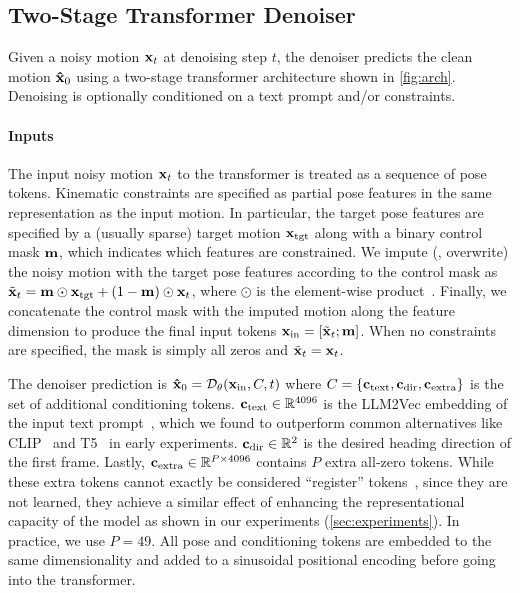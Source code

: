 \subsection{Two-Stage Transformer Denoiser}
\label{sec:method:diffusion_arch}

Given a noisy motion $\mathbf{x}_t$ at denoising step $t$, the denoiser predicts the clean motion $\mathbf{\hat{x}}_{0}$ using a two-stage transformer architecture shown in \cref{fig:arch}. Denoising is optionally conditioned on a text prompt and/or constraints.

\paragraph{Inputs}
The input noisy motion $\mathbf{x}_t$ to the transformer is treated as a sequence of pose tokens. 
Kinematic constraints are specified as partial pose features in the same representation as the input motion. In particular, the target pose features are specified by a (usually sparse) target motion $\mathbf{x}_{\text{tgt}}$ along with a binary control mask $\mathbf{m}$, which indicates which features are constrained. 
We impute (\ie, overwrite) the noisy motion with the target pose features according to the control mask as $\tilde{\mathbf{x}}_t = \mathbf{m} \odot \mathbf{x}_{\text{tgt}} + (1 - \mathbf{m}) \odot \mathbf{x}_t$, where $\odot$ is the element-wise product~\cite{cohan2024condmdi}.
Finally, we concatenate the control mask with the imputed motion along the feature dimension to produce the final input tokens $\mathbf{x}_{\text{in}} = [\tilde{\mathbf{x}}_t; \mathbf{m}]$. 
When no constraints are specified, the mask is simply all zeros and $\tilde{\mathbf{x}}_t = \mathbf{x}_t$.

The denoiser prediction is $\mathbf{\hat{x}}_{0} = \mathcal{D}_\theta(\mathbf{x}_{\text{in}}, C, t)$ where $C = \{ \mathbf{c}_\text{text}, \mathbf{c}_\text{dir}, \mathbf{c}_\text{extra} \}$ is the set of additional conditioning tokens. 
$\mathbf{c}_\text{text} \in \mathbb{R}^{4096}$ is the LLM2Vec embedding of the input text prompt~\cite{llm2vec2024}, which we found to outperform common alternatives like CLIP~\cite{radford2021learning} and T5~\cite{raffel2020t5} in early experiments. 
$\mathbf{c}_\text{dir} \in \mathbb{R}^2$ is the desired heading direction of the first frame. 
Lastly, $\mathbf{c}_\text{extra} \in \mathbb{R}^{P \times 4096}$ contains $P$ extra all-zero tokens. 
While these extra tokens cannot exactly be considered ``register'' tokens~\cite{darcet2023vision}, since they are not learned, they achieve a similar effect of enhancing the representational capacity of the model as shown in our experiments (\cref{sec:experiments}). In practice, we use $P=49$.
All pose and conditioning tokens are embedded to the same dimensionality and added to a sinusoidal positional encoding before going into the transformer.

